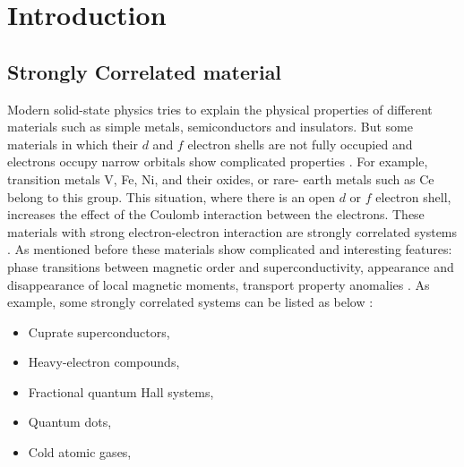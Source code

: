 \chapter{Introduction}


\section{Strongly Correlated material}

Modern solid-state physics tries to explain the physical properties of different materials such as simple metals, semiconductors and insulators. But some materials in which their $d$ and $f$ electron shells are not fully occupied and electrons occupy narrow orbitals show complicated properties \cite{Gabriel}. For example, transition metals V, Fe, Ni, and their oxides, or rare- earth metals such as Ce belong to this group. This situation, where there is an open $d$ or $f$ electron shell, increases the effect of the Coulomb interaction between the electrons. These materials with strong electron-electron interaction are strongly correlated systems \cite{Piers}. As mentioned before these materials show complicated and interesting features: phase transitions between magnetic order and superconductivity, appearance and disappearance of local magnetic moments, transport property anomalies \cite{Vladimir}. As example, some strongly correlated systems can be listed as below \cite{Piers}:

\begin{itemize}
    \item Cuprate superconductors, 
    \item Heavy-electron compounds,
    \item Fractional quantum Hall systems,
    \item Quantum dots,
    \item Cold atomic gases,
\end{itemize}

